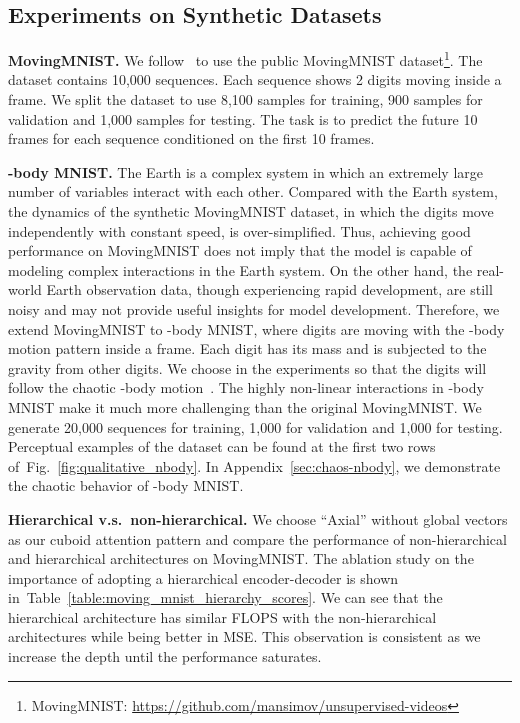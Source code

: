 \documentclass{article}
\newcommand{\tabref}[1]{Table~\ref{#1}}
\newcommand{\figref}[1]{Fig.~\ref{#1}}
\renewcommand{\paragraph}[1]{\textbf{#1. }}
\def\nbody{-body MNIST}
\begin{document}
\subsection{Experiments on Synthetic Datasets}
\label{sec:exp_synthetic}


\paragraph{MovingMNIST}
We follow~\cite{srivastava2015unsupervised} to use the public MovingMNIST dataset\footnote{MovingMNIST: \url{https://github.com/mansimov/unsupervised-videos}}. 
The dataset contains 10,000 sequences. Each sequence shows 2 digits moving inside a  frame. We split the dataset to use 8,100 samples for training, 900 samples for validation and 1,000 samples for testing. The task is to predict the future 10 frames for each sequence conditioned on the first 10 frames.

\paragraph{\nbody{}}
The Earth is a complex system in which an extremely large number of variables interact with each other.
Compared with the Earth system, the dynamics of the synthetic MovingMNIST dataset, in which the digits move independently with constant speed, is over-simplified.
Thus, achieving good performance on MovingMNIST does not imply that the model is capable of modeling complex interactions in the Earth system.
On the other hand, the real-world Earth observation data, though experiencing rapid development, are still noisy and may not provide useful insights for model development.
Therefore, we extend MovingMNIST to \nbody{}, where  digits are moving with the -body motion pattern inside a  frame. Each digit has its mass and is subjected to the gravity from other digits.
We choose  in the experiments so that the digits will follow the chaotic -body motion~\cite{mj2006three}. The highly non-linear interactions in \nbody{} make it much more challenging than the original MovingMNIST. We generate 20,000 sequences for training, 1,000 for validation and 1,000 for testing. Perceptual examples of the dataset can be found at the first two rows of~\figref{fig:qualitative_nbody}. In Appendix~\ref{sec:chaos-nbody}, we demonstrate the chaotic behavior of \nbody{}.

\paragraph{Hierarchical v.s.\ non-hierarchical}
We choose ``Axial'' without global vectors as our cuboid attention pattern and compare the performance of non-hierarchical and hierarchical architectures on MovingMNIST. 
The ablation study on the importance of adopting a hierarchical encoder-decoder is shown in~\tabref{table:moving_mnist_hierarchy_scores}. We can see that the hierarchical architecture has similar FLOPS with the non-hierarchical architectures while being better in MSE. This observation is consistent as we increase the depth until the performance saturates.
\end{document}

